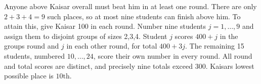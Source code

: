 Anyone above Kaisar overall must beat him in at least one round. There are only $2+3+4=9$ such places, so at most nine students can finish above him. To attain this, give Kaisar 100 in each round. Number nine students $j=1,\ldots,9$ and assign them to disjoint groups of sizes 2,3,4. Student $j$ scores $400+j$ in the group\textquotesingle s round and $j$ in each other round, for total $400+3j$. The remaining 15 students, numbered $10,\ldots,24$, score their own number in every round. All round and total scores are distinct, and precisely nine totals exceed 300. Kaisar\textquotesingle s lowest possible place is $\boxed{10\text{th}}$.
